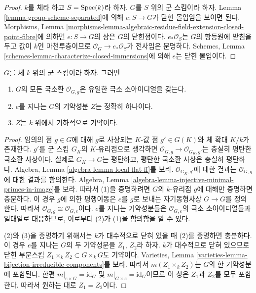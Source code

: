 \begin{proof}
$k$를 체라 하고 $S = \mathop{\mathrm{Spec}}(k)$라 하자. $G$를 $S$ 위의 군 스킴이라 하자.
Lemma \ref{lemma-group-scheme-separated}에 의해 $e : S \to G$가 닫힌 몰입임을 보이면 된다.
Morphisms, Lemma
\ref{morphisms-lemma-algebraic-residue-field-extension-closed-point-fibre}에 의하면
$e : S \to G$의 상은 $G$의 닫힌점이다. $e_*\mathcal{O}_S$는 $G$의 항등원에 받침을 두고
값이 $k$인 마천루층이므로 $\mathcal{O}_G \to e_*\mathcal{O}_S$가 전사임은 분명하다.
Schemes, Lemma \ref{schemes-lemma-characterize-closed-immersions}에 의해 $e$는 닫힌 몰입이다.
\end{proof}

\begin{lemma}
\label{lemma-group-scheme-field-geometrically-irreducible}
$G$를 체 $k$ 위의 군 스킴이라 하자. 그러면
\begin{enumerate}
\item $G$의 모든 국소환 $\mathcal{O}_{G, g}$은 유일한 극소 소아이디얼을 갖는다.
\item $e$를 지나는 $G$의 기약성분 $Z$는 정확히 하나이다.
\item $Z$는 $k$ 위에서 기하적으로 기약이다.
\end{enumerate}
\end{lemma}

\begin{proof}
임의의 점 $g \in G$에 대해 $g$로 사상되는 $K$-값 점 $g' \in G(K)$와 체 확대
$K/k$가 존재한다. $g'$를 군 스킴 $G_K$의 $K$-유리점으로 생각하면
$\mathcal{O}_{G, g} \to \mathcal{O}_{G_K, g'}$는 충실히 평탄한 국소환 사상이다. 실제로 $G_K \to G$는
평탄하고, 평탄한 국소환 사상은 충실히 평탄하다. Algebra, Lemma
\ref{algebra-lemma-local-flat-ff}를 보라. $\mathcal{O}_{G_K, g'}$에 대한 결과는
$\mathcal{O}_{G, g}$에 대한 결과를 함의한다. Algebra, Lemma
\ref{algebra-lemma-injective-minimal-primes-in-image}를 보라. 따라서 (1)을 증명하려면
$G$의 $k$-유리점 $g$에 대해만 증명하면 충분하다. 이 경우 $g$에 의한 평행이동은
$e$를 $g$로 보내는 자기동형사상 $G \to G$를 정의한다. 따라서
$\mathcal{O}_{G, g} \cong \mathcal{O}_{G, e}$이다. $e$를 지나는 기약성분들은
$\mathcal{O}_{G, e}$의 극소 소아이디얼들과 일대일로 대응하므로, 이로부터 (2)가 (1)을 함의함을 알 수 있다.

\medskip\noindent
(2)와 (3)을 증명하기 위해서는 $k$가 대수적으로 닫혀 있을 때 (2)를 증명하면 충분하다.
이 경우 $e$를 지나는 $G$의 두 기약성분을 $Z_1$, $Z_2$라 하자. $k$가 대수적으로 닫혀 있으므로
닫힌 부분스킴 $Z_1 \times_k Z_2 \subset G \times_k G$도 기약이다. Varieties, Lemma
\ref{varieties-lemma-bijection-irreducible-components}를 보라. 따라서 $m(Z_1 \times_k Z_2)$는 $G$의 한 기약성분에 포함된다.
한편 $m|_{e \times G} = \text{id}_G$ 및 $m|_{G \times e} = \text{id}_G$이므로 이 상은 $Z_1$과 $Z_2$를 모두 포함한다.
따라서 원하는 대로 $Z_1 = Z_2$이다.
\end{proof}

